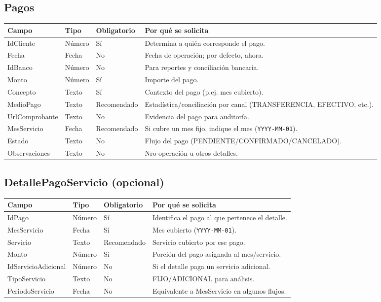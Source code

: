 \documentclass[11pt,a4paper]{article}
\begin{document}
\subsection{Pagos}
\begin{longtable}{|p{3.2cm}|p{2.2cm}|p{2.2cm}|p{6.0cm}|}
\hline
\textbf{Campo} & \textbf{Tipo} & \textbf{Obligatorio} & \textbf{Por qué se solicita} \\
\hline
IdCliente & Número & Sí & Determina a quién corresponde el pago. \\
Fecha & Fecha & No & Fecha de operación; por defecto, ahora. \\
IdBanco & Número & No & Para reportes y conciliación bancaria. \\
Monto & Número & Sí & Importe del pago. \\
Concepto & Texto & Sí & Contexto del pago (p.ej. mes cubierto). \\
MedioPago & Texto & Recomendado & Estadística/conciliación por canal (TRANSFERENCIA, EFECTIVO, etc.). \\
UrlComprobante & Texto & No & Evidencia del pago para auditoría. \\
MesServicio & Fecha & Recomendado & Si cubre un mes fijo, indique el mes (\texttt{YYYY-MM-01}). \\
Estado & Texto & No & Flujo del pago (PENDIENTE/CONFIRMADO/CANCELADO). \\
Observaciones & Texto & No & Nro operación u otros detalles. \\
\hline
\end{longtable}

\subsection{DetallePagoServicio (opcional)}
\begin{longtable}{|p{3.2cm}|p{2.2cm}|p{2.2cm}|p{6.0cm}|}
\hline
\textbf{Campo} & \textbf{Tipo} & \textbf{Obligatorio} & \textbf{Por qué se solicita} \\
\hline
IdPago & Número & Sí & Identifica el pago al que pertenece el detalle. \\
MesServicio & Fecha & Sí & Mes cubierto (\texttt{YYYY-MM-01}). \\
Servicio & Texto & Recomendado & Servicio cubierto por ese pago. \\
Monto & Número & Sí & Porción del pago asignada al mes/servicio. \\
IdServicioAdicional & Número & No & Si el detalle paga un servicio adicional. \\
TipoServicio & Texto & No & FIJO/ADICIONAL para análisis. \\
PeriodoServicio & Fecha & No & Equivalente a MesServicio en algunos flujos. \\
\hline
\end{longtable}
\end{document}
